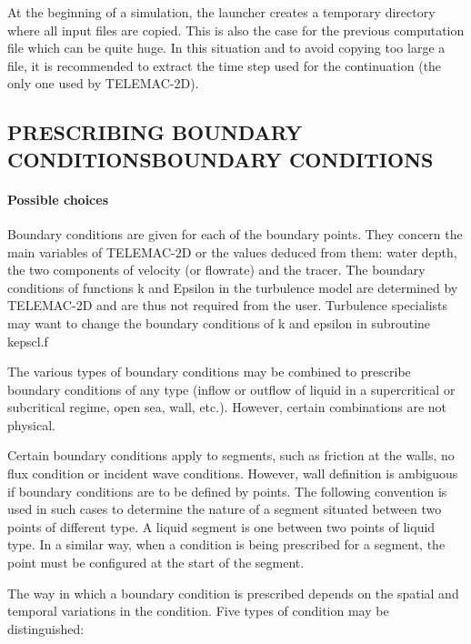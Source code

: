 \documentclass{article} %
\begin{document}
 At the beginning of a simulation, the launcher creates a temporary directory where all input files are copied. This is also the case for the previous computation file which can be quite huge. In this situation and to avoid copying too large a file, it is recommended to extract the time step used for the continuation (the only one used by TELEMAC-2D).


\subsection{ PRESCRIBING BOUNDARY CONDITIONSBOUNDARY CONDITIONS}


\paragraph{ Possible choices}

 Boundary conditions are given for each of the boundary points. They concern the main variables of TELEMAC-2D or the values deduced from them: water depth, the two components of velocity (or flowrate) and the tracer. The boundary conditions of functions k and Epsilon in the turbulence model are determined by TELEMAC-2D and are thus not required from the user. Turbulence specialists may want to change the boundary conditions of k and epsilon in subroutine kepscl.f

 The various types of boundary conditions may be combined to prescribe boundary conditions of any type (inflow or outflow of liquid in a supercritical or subcritical regime, open sea, wall, etc.). However, certain combinations are not physical.

 Certain boundary conditions apply to segments, such as friction at the walls, no flux condition or incident wave conditions. However, wall definition is ambiguous if boundary conditions are to be defined by points. The following convention is used in such cases to determine the nature of a segment situated between two points of different type. A liquid segment is one between two points of liquid type. In a similar way, when a condition is being prescribed for a segment, the point must be configured at the start of the segment.

 The way in which a boundary condition is prescribed depends on the spatial and temporal variations in the condition. Five types of condition may be distinguished:
\end{document}
